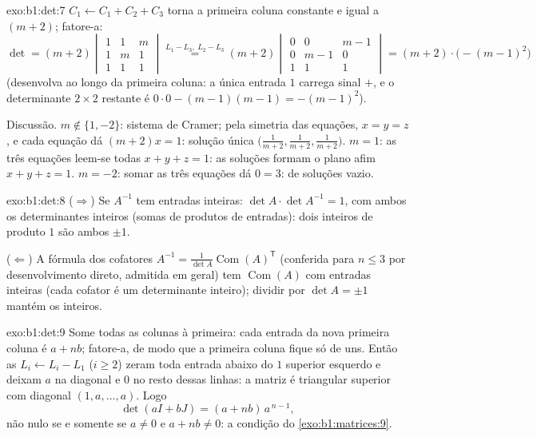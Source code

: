 \begin{solution}{exo:b1:det:7}
$C_1 \leftarrow C_1 + C_2 + C_3$ torna a primeira coluna constante e igual a $(m+2)$;
fatore-a:
\[
\det = (m+2)\begin{vmatrix}
1 & 1 & m\\ 1 & m & 1\\ 1 & 1 & 1
\end{vmatrix}
\overset{L_1 - L_3,\ L_2 - L_3}{=}
(m+2)\begin{vmatrix}
0 & 0 & m-1\\ 0 & m-1 & 0\\ 1 & 1 & 1
\end{vmatrix}
= (m+2)\cdot\bigl(-(m-1)^2\bigr)
\]
(desenvolva ao longo da primeira coluna: a única entrada $1$ carrega
sinal $+$, e o determinante $2 \times 2$ restante é $0 \cdot 0 -
(m-1)(m-1) = -(m-1)^2$).

Discussão. $m \notin \{1, -2\}$: sistema de Cramer; pela simetria das equações,
$x = y = z$, e cada equação dá $(m + 2)x = 1$: solução única $\bigl(\frac{1}{m+2}, \frac{1}{m+2},
\frac{1}{m+2}\bigr)$. $m = 1$: as
três equações leem-se todas $x + y
+ z = 1$: as soluções formam o plano afim
$x + y + z = 1$. $m = -2$: somar as três equações dá $0 = 3$:  de
soluções vazio.
\end{solution}

\begin{solution}{exo:b1:det:8}
($\Rightarrow$) Se $A^{-1}$ tem entradas inteiras: $\det A \cdot \det
A^{-1} = 1$, com ambos os
determinantes inteiros (somas de produtos de entradas): dois
inteiros de produto $1$ são ambos $\pm1$.

($\Leftarrow$) A fórmula dos cofatores $A^{-1} = \frac{1}{\det
A}\operatorname{Com}(A)^{\mathsf T}$ (conferida para $n \leq 3$ por
desenvolvimento direto, admitida em geral) tem $\operatorname{Com}(A)$ com entradas
inteiras (cada cofator é um determinante inteiro); dividir por $\det A = \pm 1$
mantém os inteiros.
\end{solution}

\begin{solution}{exo:b1:det:9}
Some todas as colunas à primeira: cada entrada da nova primeira
coluna é $a + nb$; fatore-a, de modo que a primeira coluna fique só
de uns. Então as  $L_i \leftarrow L_i - L_1$ ($i \geq 2$) zeram toda
entrada abaixo do $1$ superior esquerdo e deixam $a$ na diagonal e
$0$ no resto dessas linhas: a matriz é triangular superior com
diagonal $(1, a, \dots, a)$. Logo
\[
\det(aI + bJ) = (a + nb)\, a^{\,n-1} ,
\]
não nulo se e somente se $a \neq 0$ e $a + nb \neq 0$: a condição do \cref{exo:b1:matrices:9}.
\end{solution}

